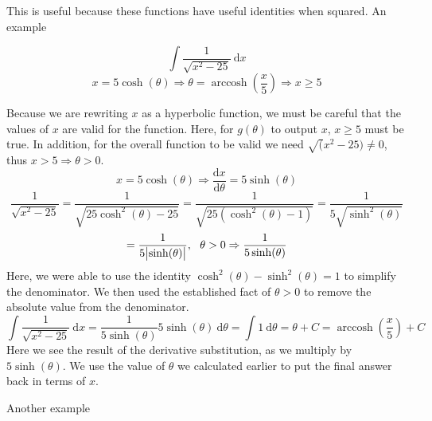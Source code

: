 \documentclass[12pt]{report}
\newcommand{\dx}{\:\mathrm{d}x}
\newcommand{\dd}[2]{\frac{\mathrm{d}#1}{\mathrm{d}#2}}
\newcommand{\mcom}{, \:\:\:}
\DeclareMathOperator{\arccosh}{arccosh}
\begin{document}
\begin{flushleft}
This is useful because these functions have useful identities when squared. An
example

\[\int\frac{1}{\sqrt{x^2 - 25}}\dx\]
\[x = 5\cosh(\theta) \Rightarrow \theta = \arccosh\left(\frac{x}{5}\right)
\Rightarrow x \geq 5\]
\begin{center}
Because we are rewriting \(x\) as a hyperbolic function, we must be careful
that the values of \(x\) are valid for the function. Here, for 
\(g(\theta)\) to output \(x\), \(x\geq5\) must be true. In addition, for
the overall function to be valid we need \(\sqrt(x^2 - 25) \neq 0\), thus
\(x > 5 \Rightarrow \theta > 0\).
\[x = 5\cosh(\theta) \Rightarrow \dd{x}{\theta} = 5\sinh(\theta)\]
\[\frac{1}{\sqrt{x^2 - 25}} = \frac{1}{\sqrt{25\cosh^2(\theta) - 25}} =
\frac{1}{\sqrt{25(\cosh^2(\theta) - 1)}} = \frac{1}{5\sqrt{\sinh^2(\theta)}}\] 
\[= \frac{1}{5\abs{\sinh(\theta)}}\mcom \theta > 0 \Rightarrow
\frac{1}{5\sinh(\theta)}\]
Here, we were able to use the identity 
\(\cosh^2(\theta) - \sinh^2(\theta) = 1\) to simplify the denominator. We
then used the established fact of \(\theta > 0\) to remove the absolute
value from the denominator.
\[\int\frac{1}{\sqrt{x^2 - 25}}\dx 
= \frac{1}{5\sinh(\theta)}5\sinh(\theta)\:\mathrm{d}\theta
= \int 1 \:\mathrm{d}\theta = \theta + C 
= \arccosh\left(\frac{x}{5}\right) + C\]
Here we see the result of the derivative substitution, as we multiply by
\(5\sinh(\theta)\). We use the value of \(\theta\) we calculated earlier to
put the final answer back in terms of \(x\).        
\end{center}

Another example


\end{flushleft}
\end{document}
